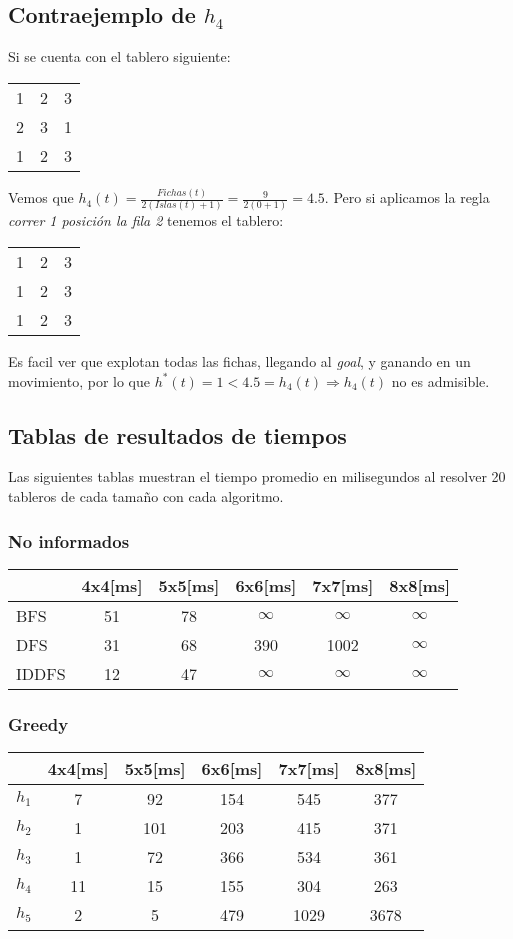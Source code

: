 \documentclass[%
    final,
    reprint,
    notitlepage,
    narroweqnarray,
    inline,
    twoside,
    invited
    ]{ieee}
\begin{document}
\subsection{Contraejemplo de $h_4$}\label{anexo:ejemploh4}
Si se cuenta con el tablero siguiente:
\begin{center}
\begin{tabular}{ l c r }
  1 & 2 & 3 \\
  2 & 3 & 1 \\
  1 & 2 & 3 \\
\end{tabular}
\end{center}
Vemos que $h_4(t) = \frac{Fichas(t)}{2(Islas(t)+1)} = \frac{9}{2(0+1)} = 4.5$.
Pero si aplicamos la regla \emph{correr 1 posici\'on la fila 2} tenemos el tablero:
\begin{center}
\begin{tabular}{ l c r }
  1 & 2 & 3 \\
  1 & 2 & 3 \\
  1 & 2 & 3 \\
\end{tabular}
\end{center}
Es facil ver que explotan todas las fichas, llegando al \textit{goal}, y ganando en un movimiento, por lo que $h^*(t)=1 < 4.5 = h_4(t) \Rightarrow h_4(t)$ no es admisible. 

\subsection{Tablas de resultados de tiempos}\label{anexo:tabla}
Las siguientes tablas muestran el tiempo promedio en milisegundos al resolver 20 tableros de cada tama\~no con cada algoritmo.
\subsubsection{No informados}
\begin{tabular}{l|c|c|c|c|c}
   & 4x4[ms] & 5x5[ms] & 6x6[ms] & 7x7[ms] & 8x8[ms] \\
  \hline
  BFS & 51 & 78 & $\infty$ & $\infty$ & $\infty$ \\
  DFS & 31 & 68 & 390 & 1002 & $\infty$ \\
  IDDFS & 12 & 47 & $\infty$ & $\infty$ & $\infty$ \\
\end{tabular}
\subsubsection{Greedy}
\begin{tabular}{l|c|c|c|c|c}
   & 4x4[ms] & 5x5[ms] & 6x6[ms] & 7x7[ms] & 8x8[ms] \\
  \hline
  $h_1$ & 7 & 92 & 154 & 545 & 377 \\
  $h_2$ & 1 & 101 & 203 & 415 & 371 \\
  $h_3$ & 1 & 72 & 366 & 534 & 361 \\
  $h_4$ & 11 & 15 & 155 & 304 & 263 \\
  $h_5$ & 2 & 5 & 479 & 1029 & 3678 \\
\end{tabular}
\end{document}
